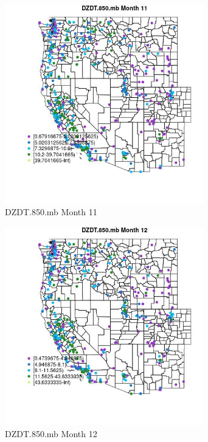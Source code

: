 \begin{figure} 
\centering  
\includegraphics[width=0.77\textwidth]{Code_Outputs/ML_input_report_ML_input_PM25_Step5_part_d_de_duplicated_aves_ML_input_MapObsMo11DZDT850mb.jpg} 
\caption{\label{fig:ML_input_report_ML_input_PM25_Step5_part_d_de_duplicated_aves_ML_inputMapObsMo11DZDT850mb}DZDT.850.mb Month 11} 
\end{figure} 
 

\begin{figure} 
\centering  
\includegraphics[width=0.77\textwidth]{Code_Outputs/ML_input_report_ML_input_PM25_Step5_part_d_de_duplicated_aves_ML_input_MapObsMo12DZDT850mb.jpg} 
\caption{\label{fig:ML_input_report_ML_input_PM25_Step5_part_d_de_duplicated_aves_ML_inputMapObsMo12DZDT850mb}DZDT.850.mb Month 12} 
\end{figure} 
 

